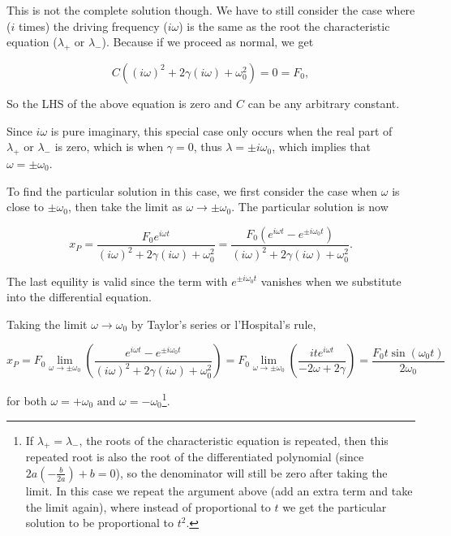 \documentclass[english,a4paper,12pt]{report}
\begin{document}
{This is not the complete solution though. We have to still consider the case where (\(i\) times)  the driving frequency (\(i \omega \)) is the same as the root the characteristic equation (\(\lambda _{+} \text { or } \lambda _{-}  \)). Because if we proceed as normal, we get

\begin{equation}
     C((i\omega) ^2 + 2\gamma (i\omega) + \omega _{0}^2) = 0 = F_0,
\end{equation}

So the LHS of the above equation is zero and \(C\) can be any arbitrary constant.

Since \(i \omega \) is pure imaginary, this special case only occurs when the real part of \(\lambda _{+} \text { or } \lambda _{-}  \) is zero, which is when \(\gamma  = 0\), thus \(\lambda = \pm i \omega _{0} \), which implies that \(\omega = \pm \omega _{0} \).

To find the particular solution in this case, we first consider the case when \(\omega \) is close to \(\pm \omega _{0} \), then take the limit as \(\omega \rightarrow \pm \omega _{0} \). The particular solution is now

\begin{equation}
    x_{P} = \frac{F_0 e^{i \omega t} }{(i\omega) ^2 + 2\gamma (i\omega) + \omega _{0} ^2} =  \frac{F_0 (e^{i\omega t} - e^{\pm i \omega _{0}  t})  }{(i\omega) ^2 + 2\gamma (i\omega)  + \omega _{0} ^2}.
\end{equation}

The last equility is valid since the term with \(e^{\pm i \omega _{0}  t} \) vanishes when we substitute into the differential equation. 

Taking the limit \(\omega \rightarrow \omega _{0} \) by Taylor's series or l'Hospital's rule, 

\begin{equation}
    x_{P} = F_0 \lim_{\omega  \to \pm \omega _{0}  } \left(  \frac{e^{i \omega t} - e^{\pm i \omega _{0}  t}  }{(i\omega) ^2 + 2\gamma (i\omega)  + \omega _{0} ^2} \right) = F_0 \lim_{\omega  \to \pm \omega _{0} } \left(\frac{ite^{i \omega t} }{-2\omega + 2\gamma } \right) = \frac{F_0 t \sin (\omega _{0}t )}{2 \omega _{0} }
\end{equation}

for both \(\omega = + \omega _{0} \text { and } \omega = - \omega _{0} \)\footnote{If \(\lambda _{+} = \lambda _{-}  \), \ie the roots of the characteristic equation is repeated, then this repeated root is also the root of the differentiated polynomial (since \(2a(-\frac{b}{2a} ) + b = 0\)), so the denominator will still be zero after taking the limit. In this case we repeat the argument above (add an extra term and take the limit again), where instead of proportional to \(t\) we get the particular solution to be proportional to \(t^2\).}.

}
\end{document}
